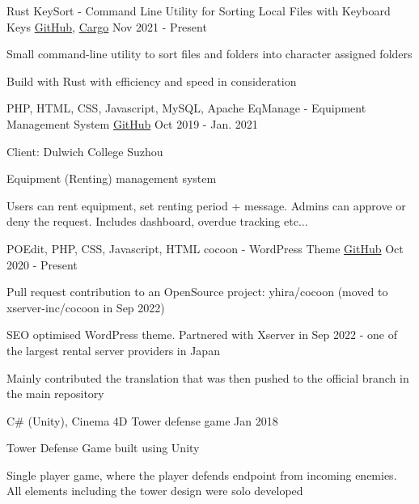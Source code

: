 \begin{cventries}
  \cventry
    {Rust} 
    {KeySort - Command Line Utility for Sorting Local Files with Keyboard Keys}
    {\href{https://github.com/UnciaBit/KeySort-cli}{GitHub}, \href{https://crates.io/crates/keysort}{Cargo}} %
    {Nov 2021 - Present}
    {
      \begin{cvitems}
        \item {Small command-line utility to sort files and folders into character assigned folders}
        \item {Build with Rust with efficiency and speed in consideration}
      \end{cvitems}
    }

  \cventry
    {PHP, HTML, CSS, Javascript, MySQL, Apache}
    {EqManage - Equipment Management System}
    {\href{https://github.com/YukiKume/EqManage}{GitHub}} %
    {Oct 2019 - Jan. 2021}
    {
      \begin{cvitems}
        \item {Client: Dulwich College Suzhou}
        \item {Equipment (Renting) management system}
        \item {Users can rent equipment, set renting period + message. Admins can approve or deny the request. Includes dashboard, overdue tracking etc...}
      \end{cvitems}
    }

  \cventry
  {POEdit, PHP, CSS, Javascript, HTML}
  {cocoon - WordPress Theme}
  {\href{https://github.com/WrenHainsworth/cocoon}{GitHub}} %
  {Oct 2020 - Present}
  {
    \begin{cvitems}
      \item {Pull request contribution to an OpenSource project: yhira/cocoon (moved to xserver-inc/cocoon in Sep 2022)}
      \item {SEO optimised WordPress theme. Partnered with Xserver in Sep 2022 - one of the largest rental server providers in Japan}
      \item {Mainly contributed the translation that was then pushed to the official branch in the main repository}
    \end{cvitems}
  }

  \cventry
  {C\# (Unity), Cinema 4D}
  {Tower defense game}
  {} %
  {Jan 2018}
  {
    \begin{cvitems}
      \item {Tower Defense Game built using Unity}
      \item {Single player game, where the player defends endpoint from incoming enemies. All elements including the tower design were solo developed}
    \end{cvitems}
  }


\end{cventries}
